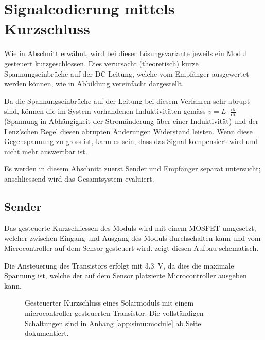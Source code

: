 \clearpage
\section{Signalcodierung mittels Kurzschluss}
\label{sec:simu:short}

Wie in Abschnitt  erw\"ahnt, wird bei dieser L\"osungsvariante
jeweils  ein Modul  gesteuert  kurzgeschlossen. Dies verursacht  (theoretisch)
kurze  Spannungseinbr\"uche   auf  der  DC-Leitung,  welche   vom  Empf\"anger
ausgewertet  werden  k\"onnen,  wie in  Abbildung  vereinfacht
dargestellt.

Da die Spannungseinbr\"uche  auf der Leitung bei diesem  Verfahren sehr abrupt
sind,  k\"onnen  die im  System  vorhandenen  Induktivit\"aten gem\"ass  $v  =
L  \cdot  \frac{\mathrm{d}i}{\mathrm{d}t}$  (Spannung  in  Abh\"angigkeit  der
Strom\"anderung \"uber  einer Induktivit\"at) und der  Lenz'schen Regel diesen
abrupten \"Anderungen  Widerstand leisten. Wenn  diese Gegenspannung  zu gross
ist, kann es sein, dass das  Signal kompensiert wird und nicht mehr auswertbar
ist.

Es  werden  in   diesem  Abschnitt  zuerst  Sender   und  Empf\"anger  separat
untersucht; anschliessend wird das Gesamtsystem evaluiert.


\subsection{Sender}
\label{subsec:simu:ask:sensor}

Das  gesteuerte Kurzschliessen  des Moduls  wird mit  einem MOSFET  umgesetzt,
welcher zwischen  Eingang und  Ausgang des Moduls  durchschalten kann  und vom
Microcontroller auf dem Sensor gesteuert wird. 
zeigt diesen Aufbau schematisch.

Die  Ansteuerung des  Transistors  erfolgt mit  \SI{3.3}{\volt},  da dies  die
maximale Spannung  ist, welche der  auf dem Sensor  platzierte Microcontroller
ausgeben kann.

\begin{figure}[h!tb]
    \centering
    
    \caption{%
        Gesteuerter     Kurzschluss     eines    Solarmoduls     mit     einem
        microcontroller-gesteuerten       Transistor. Die      vollst\"andigen
        -Schaltungen  sind  in Anhang  \ref{app:simu:module}  ab
        Seite \pageref{app:simu:module} dokumentiert.%
    }
    \label{fig:module:mosfet:simple}
\end{figure}


